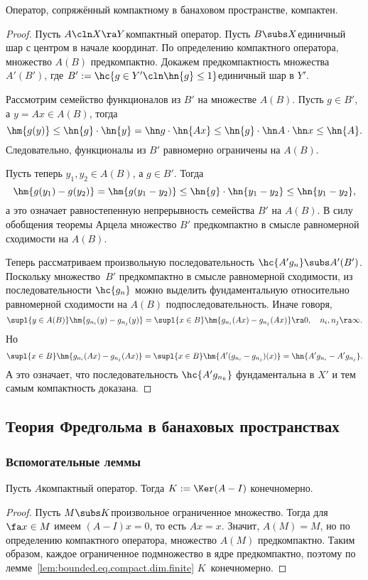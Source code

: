 \documentclass[a4paper]{article}
\begin{document}
\begin{theorem}
Оператор, сопряжённый компактному в банаховом пространстве, компактен.
\end{theorem}
\begin{proof}
Пусть $A\cln X\ra Y$\т компактный оператор. Пусть $B \subs X$\т единичный шар с центром в начале координат.
По определению компактного оператора, множество $A(B)$ предкомпактно. Докажем предкомпактность
множества $A'(B')$, где $B' := \hc{g \in Y'\cln \hn{g} \le 1}$\т единичный шар в $Y'$.

Рассмотрим семейство функционалов из $B'$ на множестве $A(B)$.
Пусть $g \in B'$, а $y = Ax \in A(B)$, тогда
$$\hm{g(y)} \le \hn{g}\cdot \hn{y} = \hn g \cdot \hn{Ax} \le \hn{g} \cdot \hn A \cdot \hn x \le \hn{A}.$$
Следовательно, функционалы из $B'$ равномерно ограничены на $A(B)$.

Пусть теперь $y_1, y_2 \in A(B)$, а $g \in B'$. Тогда
$$\hm{g(y_1) - g(y_2)} = \hm{g(y_1-y_2)} \le \hn{g}\cdot\hn{y_1-y_2} \le \hn{y_1-y_2},$$
а это означает равностепенную непрерывность семейства $B'$ на $A(B)$. В силу обобщения
теоремы Арцела множество $B'$ предкомпактно в смысле равномерной сходимости на $A(B)$.

Теперь рассматриваем произвольную последовательность $\hc{A'g_n} \subs A'(B')$.
Поскольку множество~$B'$ предкомпактно в смысле равномерной сходимости, из последовательности $\hc{g_n}$
можно выделить фундаментальную относительно равномерной сходимости на $A(B)$ подпоследовательность.
Иначе говоря,
$$\supl{y \in A(B)} \hm{g_{n_i}(y) - g_{n_j}(y)} = \supl{x \in B} \hm{g_{n_i}(Ax) - g_{n_j}(Ax)} \ra 0,
\quad n_i, n_j \ra \infty.$$
Но
$$\supl{x \in B} \hm{g_{n_i}(Ax) - g_{n_j}(Ax)}  = \supl{x \in B} \hm{A'(g_{n_i}-g_{n_j})(x)}  =
\hn{A'g_{n_i} - A'g_{n_j}}.$$
А это означает, что последовательность $\hc{A'g_{n_k}}$ фундаментальна в $X'$ и тем самым компактность
доказана.
\end{proof}

\subsection{Теория Фредгольма в банаховых пространствах}

\subsubsection{Вспомогательные леммы}

\begin{lemma}\label{lem:dim.ker.finite}
Пусть $A$\т компактный оператор. Тогда $K := \Ker(A - I)$ конечномерно.
\end{lemma}
\begin{proof}
Пусть $M \subs K$\т произвольное ограниченное множество.
Тогда для $\fa x \in M$ имеем $(A-I)x =0$, то есть $Ax = x$.
Значит, $A(M) = M$, но по определению компактного оператора,
множество $A(M)$ предкомпактно. Таким образом, каждое ограниченное подмножество
в ядре предкомпактно, поэтому по лемме~\ref{lem:bounded.eq.compact.dim.finite}
$K$~конечномерно.
\end{proof}
\end{document}
